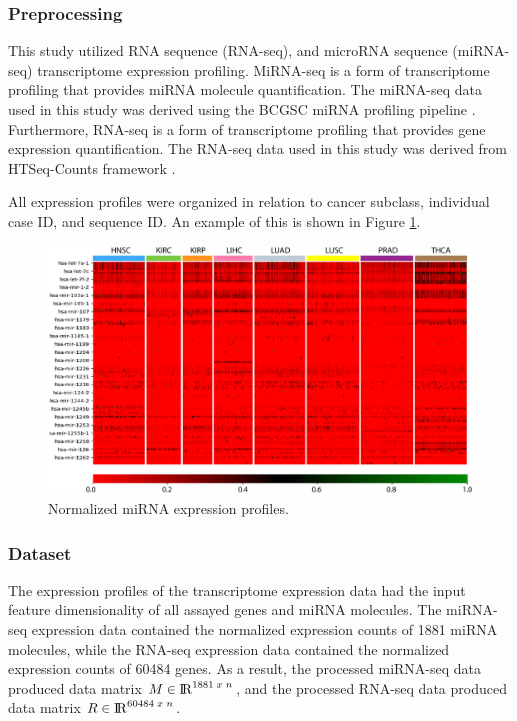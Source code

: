 \subsubsection{Preprocessing}

This study utilized RNA sequence (RNA-seq), and microRNA sequence (miRNA-seq) transcriptome expression profiling. MiRNA-seq is a form of transcriptome profiling that provides miRNA molecule quantification. The miRNA-seq data used in this study was derived using the BCGSC miRNA profiling pipeline \cite{chu2015large}. Furthermore, RNA-seq is a form of transcriptome profiling that provides gene expression quantification. The RNA-seq data used in this study was derived from HTSeq-Counts framework \cite{anders2015htseq}.

All expression profiles were organized in relation to cancer subclass, individual case ID, and sequence ID. An example of this is shown in Figure \ref{fig:expmirna}.

\begin{figure}[h!]
    \centering
    \includegraphics[width=\textwidth]{img/expmirna.png}
    \noindent
    \caption{Normalized miRNA expression profiles.}
    \label{fig:expmirna}
\end{figure}

\subsubsection{Dataset}

The expression profiles of the transcriptome expression data had the input feature dimensionality of all assayed genes and miRNA molecules. The miRNA-seq expression data contained the normalized expression counts of 1881 miRNA molecules, while the RNA-seq expression data contained the normalized expression counts of 60484 genes. As a result, the processed miRNA-seq data produced data matrix $M \in {\rm I\!R}^{1881 \; x \; n}$, and the processed RNA-seq data produced data matrix $R \in {\rm I\!R}^{60484 \; x \; n}$.

